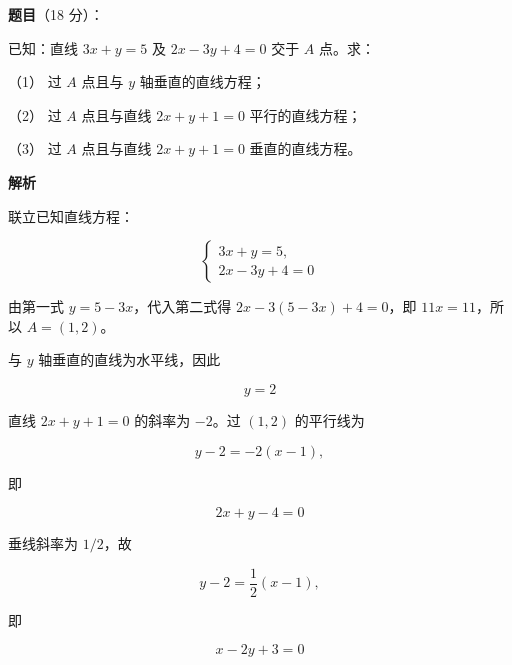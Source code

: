 \begin{answer}

\textbf{题目}（18 分）：

已知：直线 $3x+y=5$ 及 $2x-3y+4=0$ 交于 $A$ 点。求：

（1） 过 $A$ 点且与 $y$ 轴垂直的直线方程；

（2） 过 $A$ 点且与直线 $2x+y+1=0$ 平行的直线方程；

（3） 过 $A$ 点且与直线 $2x+y+1=0$ 垂直的直线方程。

\textbf{解析}

联立已知直线方程：

\nopagebreak[4]
\[
\begin{cases}
3x+y=5,\\
2x-3y+4=0
\end{cases}
\]

由第一式 $y=5-3x$，代入第二式得 $2x-3(5-3x)+4=0$，即 $11x=11$，所以 $A=(1,2)$。


与 $y$ 轴垂直的直线为水平线，因此

\nopagebreak[4]
\[
y=2
\]


直线 $2x+y+1=0$ 的斜率为 $-2$。过 $(1,2)$ 的平行线为

\nopagebreak[4]
\[
y-2=-2(x-1),
\]

即

\nopagebreak[4]
\[
2x+y-4=0
\]


垂线斜率为 $1/2$，故

\nopagebreak[4]
\[
y-2=\frac12(x-1),
\]

即

\nopagebreak[4]
\[
x-2y+3=0
\]




\end{answer}
